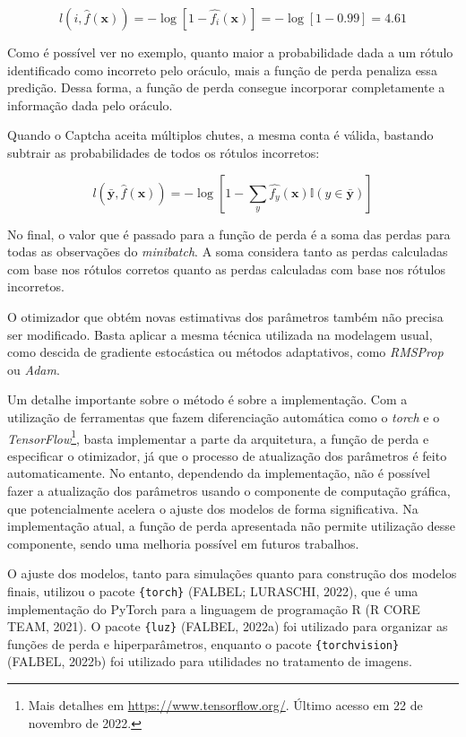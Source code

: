 \documentclass[12pt,twoside,brazilian]{book}
\begin{document}
\[
l(i,\hat f(\mathbf x)) = -\log\left[1-\hat {f_i}(\mathbf x)\right] = -\log\left[1-0.99 \right] = 4.61
\]

Como é possível ver no exemplo, quanto maior a probabilidade dada a um
rótulo identificado como incorreto pelo oráculo, mais a função de perda
penaliza essa predição. Dessa forma, a função de perda consegue
incorporar completamente a informação dada pelo oráculo.

Quando o Captcha aceita múltiplos chutes, a mesma conta é válida,
bastando subtrair as probabilidades de todos os rótulos incorretos:

\[
l(\bar {\mathbf y}, \hat f(\mathbf x)) = -\log\left[1 - \sum_{y}\hat {f_y}(\mathbf x) \mathbb I(y \in \bar {\mathbf y})\right]
\]

No final, o valor que é passado para a função de perda é a soma das
perdas para todas as observações do \emph{minibatch}. A soma considera
tanto as perdas calculadas com base nos rótulos corretos quanto as
perdas calculadas com base nos rótulos incorretos.

O otimizador que obtém novas estimativas dos parâmetros também não
precisa ser modificado. Basta aplicar a mesma técnica utilizada na
modelagem usual, como descida de gradiente estocástica ou métodos
adaptativos, como \emph{RMSProp} ou \emph{Adam}.

Um detalhe importante sobre o método é sobre a implementação. Com a
utilização de ferramentas que fazem diferenciação automática como o
\emph{torch} e o \emph{TensorFlow}\footnote{Mais detalhes em
  \url{https://www.tensorflow.org/}. Último acesso em 22 de novembro de
  2022.}, basta implementar a parte da arquitetura, a função de perda e
especificar o otimizador, já que o processo de atualização dos
parâmetros é feito automaticamente. No entanto, dependendo da
implementação, não é possível fazer a atualização dos parâmetros usando
o componente de computação gráfica, que potencialmente acelera o ajuste
dos modelos de forma significativa. Na implementação atual, a função de
perda apresentada não permite utilização desse componente, sendo uma
melhoria possível em futuros trabalhos.

O ajuste dos modelos, tanto para simulações quanto para construção dos
modelos finais, utilizou o pacote \texttt{\{torch\}} (FALBEL; LURASCHI,
2022), que é uma implementação do PyTorch para a linguagem de
programação R (R CORE TEAM, 2021). O pacote \texttt{\{luz\}} (FALBEL,
2022a) foi utilizado para organizar as funções de perda e
hiperparâmetros, enquanto o pacote \texttt{\{torchvision\}} (FALBEL,
2022b) foi utilizado para utilidades no tratamento de imagens.
\end{document}
